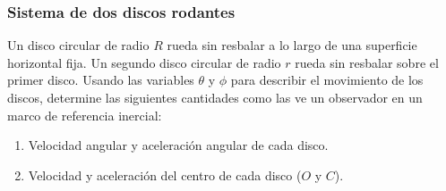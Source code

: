 \subsubsection{Sistema de dos discos rodantes}

Un disco circular de radio $R$ rueda sin resbalar a lo largo de una superficie horizontal fija. Un segundo disco circular de radio $r$ rueda sin resbalar sobre el primer disco. Usando las variables $\theta$ y $\phi$ para describir el movimiento de los discos, determine las siguientes cantidades como las ve un observador en un marco de referencia inercial:

\begin{enumerate}
    \item Velocidad angular y aceleración angular de cada disco.
    \item Velocidad y aceleración del centro de cada disco ($O$ y $C$).
\end{enumerate}

